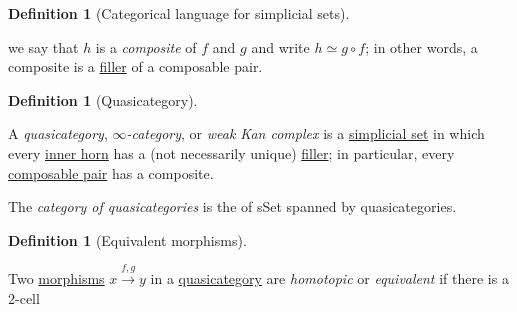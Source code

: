 \documentclass[oneside,a4paper]{book}%
\theoremstyle{definition}%
\newtheorem{definition}[theorem]{Definition}%
\begin{document}
\begin{Section}
\begin{definition}[{Categorical language for simplicial sets}]
\begin{itemize}
 
 we say that \(h\) is a \emph{composite} of \(f\) and \(g\) and write \(h\simeq    g\circ  f\); in other words, a composite is a \hyperref[rs-008D]{filler} of a composable
  pair.\end{itemize}\end{definition}\begin{definition}[{Quasicategory}]\label{rs-008H}\par{}A \emph{quasicategory}, \emph{\(\infty \)-category}, or \emph{weak Kan complex} is a
\hyperref[rs-0080]{simplicial set} in which every \hyperref[rs-008G]{inner horn} has a (not
necessarily unique) \hyperref[rs-008D]{filler}; in particular, every \hyperref[rs-008I]{composable
pair} has a composite.\par{}The \emph{category of quasicategories} is the 
 of sSet spanned by quasicategories.\end{definition}\begin{definition}[{Equivalent morphisms}]\label{rs-008K}\par{}Two \hyperref[rs-008I]{morphisms} \(x\xrightarrow {f,g} y\) in a \hyperref[rs-008H]{quasicategory} are
\emph{homotopic} or \emph{equivalent} if there is a \(2\)-cell 
 
  
  
   
    \usepackage{tikz, tikz-cd, mathtools, amssymb}
  \usetikzlibrary{shapes.geometric}
  \usetikzlibrary{calc}
  \usetikzlibrary{matrix}
  \usetikzlibrary{decorations.markings}





\end{definition}
\end{Section}
\end{document}
